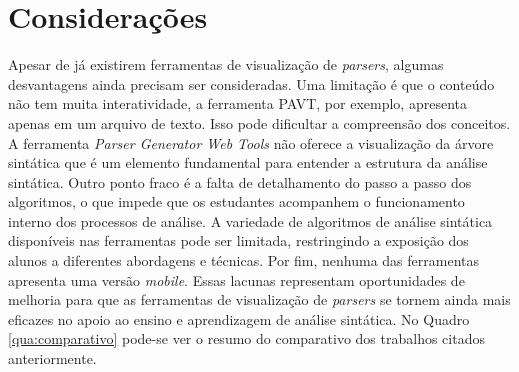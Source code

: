 \section{Considerações}
Apesar de já existirem ferramentas de visualização de \textit{parsers}, algumas desvantagens ainda precisam ser consideradas. Uma limitação é que o conteúdo não tem muita interatividade, a ferramenta PAVT, por exemplo, apresenta apenas em um arquivo de texto. Isso pode dificultar a compreensão dos conceitos. A ferramenta \textit{Parser Generator Web Tools} não oferece a visualização da árvore sintática que é um elemento fundamental para entender a estrutura da análise sintática. Outro ponto fraco é a falta de detalhamento do passo a passo dos algoritmos, o que impede que os estudantes acompanhem o funcionamento interno dos processos de análise. A variedade de algoritmos de análise sintática disponíveis nas ferramentas pode ser limitada, restringindo a exposição dos alunos a diferentes abordagens e técnicas. Por fim, nenhuma das ferramentas apresenta uma versão \textit{mobile}. Essas lacunas representam oportunidades de melhoria para que as ferramentas de visualização de \textit{parsers} se tornem ainda mais eficazes no apoio ao ensino e aprendizagem de análise sintática. No Quadro \ref{qua:comparativo} pode-se ver o resumo do comparativo dos trabalhos citados anteriormente.

\setlength{\abovecaptionskip}{10pt plus 0pt minus 0pt}
\setlength{\belowcaptionskip}{5pt plus 0pt minus 0pt}
\begin{table}[h]
\centering\setlength{\extrarowheight}{2pt}
\label{qua:comparativo}
{}
\end{table}




